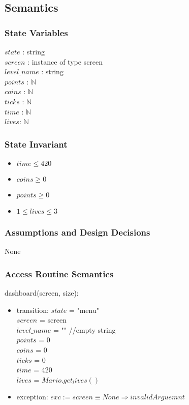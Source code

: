 \documentclass[12pt]{article}
\begin{document}
\subsection* {Semantics}

\subsubsection *{State Variables}

$state$ : string \\
$screen$ : instance of type screen \\
$level\_name$ : string \\
$points$ : $\mathbb{N}$ \\
$coins$ : $\mathbb{N}$ \\
$ticks$ : $\mathbb{N}$ \\
$time$ : $\mathbb{N}$ \\
$lives$: $\mathbb{N}$


\subsubsection* {State Invariant}
\begin{itemize}
    \item $time \leq 420$
    \item $coins \geq 0$
    \item $points \geq 0$
    \item $1 \leq lives \leq 3$
\end{itemize}

\subsubsection *{Assumptions and Design Decisions}

None

\subsubsection* {Access Routine Semantics}

\noindent dashboard(screen, size):
\begin{itemize}
    \item transition:
    $state$ = "menu" \\
    $screen$ = screen \\
    $level\_name$ = "" //empty string \\
    $points$ = 0 \\
    $coins$ = 0 \\
    $ticks$ = 0 \\
    $time$ = 420 \\
    $lives$ = $Mario.get_lives()$ \\
    \item exception: $exc := screen \equiv None \Rightarrow invalidArguemnt$
\end{itemize}
\end{document}

